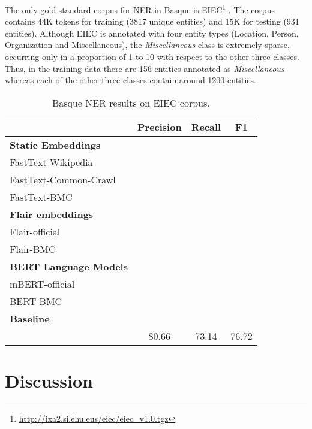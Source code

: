 \documentclass[10pt, a4paper]{article}
\begin{document}
The only gold standard corpus for NER in Basque is EIEC\footnote{\url{http://ixa2.si.ehu.eus/eiec/eiec_v1.0.tgz}} \cite{alegria2006lessons}. The corpus contains 44K tokens for training (3817 unique entities) and 15K for testing (931 entities). Although EIEC is annotated with four entity types (Location, Person, Organization and Miscellaneous), the \emph{Miscellaneous} class is extremely sparse, occurring only in a proportion of 1 to 10 with respect to the other three classes. Thus, in the training data there are 156 entities annotated as \emph{Miscellaneous} whereas each of the other three classes contain around 1200 entities.

\begin{table}[!t]\footnotesize
\centering
\begin{tabular}{@{\hspace{0.3cm}}lccc} \hline
 \textbf{} &\textbf{Precision} & \textbf{Recall} & \textbf{F1} \\ \hline
\textbf{Static Embeddings} & & &  \\
FastText-Wikipedia & & & \\
FastText-Common-Crawl &  & &  \\
FastText-BMC  &  & &  \\
\hline%
\textbf{Flair embeddings}\\
Flair-official &  &  &   \\
Flair-BMC & & &  \\ \hline
\textbf{BERT Language Models} \\
mBERT-official  &  & &   \\
BERT-BMC  &  & &   \\ \hline
\textbf{Baseline} \\
\cite{agerri2016robust} & 80.66 & 73.14 & 76.72 \\ \hline
\end{tabular}
\caption{Basque NER results on EIEC corpus.}\label{tab:ner}
\end{table}


\section{Discussion}\label{sec:discussion}
\end{document}
